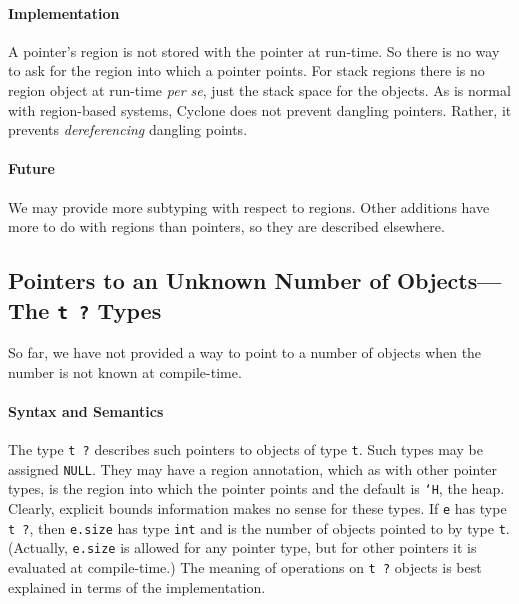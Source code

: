 \paragraph{Implementation} A pointer's region is not stored with the
pointer at run-time.  So there is no way to ask for the region into
which a pointer points.  For stack regions there is no region object
at run-time \emph{per se}, just the stack space for the objects.  As
is normal with region-based systems, Cyclone does not prevent dangling
pointers.  Rather, it prevents \emph{dereferencing} dangling points.


\paragraph{Future} We may provide more subtyping with respect to
regions.  Other additions have more to do with regions than pointers,
so they are described elsewhere.

\subsection*{\hypertarget{pointer_unknown}{Pointers to an Unknown
    Number of Objects---The \texttt{t ?} Types}}

So far, we have not provided a way to point to a number of objects
when the number is not known at compile-time.


\paragraph{Syntax and Semantics} The type \texttt{t ?} describes such pointers
to objects of type \texttt{t}.  Such types may be assigned \texttt{NULL}.
They may have a region annotation, which as with other pointer types,
is the region into which the pointer points and the default is
\texttt{`H}, the heap.  Clearly, explicit bounds information makes no
sense for these types.  If \texttt{e} has type \texttt{t ?}, then
\texttt{e.size} has type \texttt{int} and is the number of objects pointed
to by type \texttt{t}.  (Actually, \texttt{e.size} is allowed for any
pointer type, but for other pointers it is evaluated at compile-time.)
The meaning of operations on \texttt{t ?} objects is best explained in
terms of the implementation.

